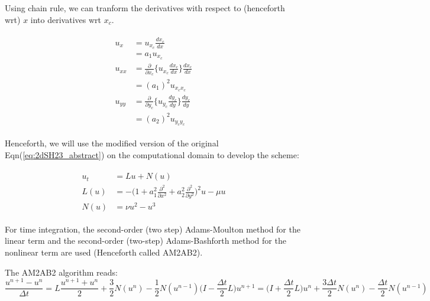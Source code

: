 \documentclass{article}
\begin{document}
Using chain rule, we can tranform the derivatives with respect to (henceforth wrt) $x$ into derivatives wrt $x_{c}$. 

\begin{align*}
 \begin{split}
  u_{x} &= u_{x_{c}} \frac{dx_{c}}{dx}\\
        &= a_{1} u_{x_{c}}\\
  u_{xx}&= \frac{\partial}{\partial x_{c}} \bigg\{u_{x_{c}} \frac{dx_{c}}{dx} \bigg\}\frac{dx_{c}}{dx}\\
        &= (a_{1})^{2} u_{x_{c} x_{c}}\\
  u_{yy}&= \frac{\partial}{\partial y_{c}} \bigg\{u_{y_{c}} \frac{dy_{c}}{dy} \bigg\}\frac{dy_{c}}{dy}\\
        &= (a_{2})^{2} u_{y_{c} y_{c}}        
 \end{split}
\end{align*}

Henceforth, we will use the modified version of the original Eqn(\ref{eq:2dSH23_abstract}) on the computational domain to develop the scheme:

\begin{align}\label{eq:2dSH23_computational}
\begin{split}
 u_{t}  &=  Lu + N(u)\\
 L(u)   &= -\bigg(1+a_{1}^{2}\frac{\partial^{2} }{\partial x^{2}} + a_{2}^{2}\frac{\partial^{2} }{\partial y^{2}} \bigg)^{2}u - \mu u\\
 N(u)   &= \nu u^{2} - u^{3}
\end{split}
\end{align}

For time integration, the second-order (two step) Adams-Moulton method for the linear term and the second-order (two-step) Adams-Bashforth method for the nonlinear term are used (Henceforth called AM2AB2).

The AM2AB2 algorithm reads:
\begin{subequations}\label{eq:AM2AB2}
 \begin{equation}
  \frac{u^{n+1}-u^{n}}{\Delta t} = L \frac{u^{n+1} + u^{n}}{2} + \frac{3}{2} N(u^{n}) - \frac{1}{2} N(u^{n-1})
 \end{equation} 
 \begin{equation}
  \bigg( I - \frac{\Delta t}{2} L \bigg) u^{n+1} = \bigg( I + \frac{\Delta t}{2} L \bigg)u^{n} + \frac{3 \Delta t}{2} N(u^{n}) - \frac{\Delta t}{2} N(u^{n-1})
 \end{equation}
\end{subequations}
\end{document}
